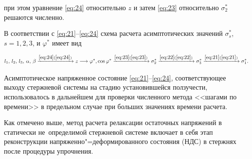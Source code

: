 при этом уравнение \eqref{eq:24} относительно $z$ и затем \eqref{eq:23} относительно $\sigma_2^{\ast}$ решаются численно. 

В соответствии с \eqref{eq:21}--\eqref{eq:24} схема расчета асимптотических значений $\sigma_s^{\ast}$, $s=1,2,3$, и $\varphi^{\ast}$ имеет вид

\begin{equation}

\label{eq:25}

l_1,\,l_2,\,l_3,\,\alpha,\,\beta

\xrightarrow{\eqref{eq:24}(\ref{eq:24})}


z

\longrightarrow 

\varphi^{\ast}, \cos{\varphi^{\ast}}

\xrightarrow{\eqref{eq:23}(\ref{eq:23})}


\sigma_{2}^{\ast}

\xrightarrow{\eqref{eq:22}(\ref{eq:22})}


\sigma_{3}^{\ast}

\xrightarrow{\eqref{eq:21}(\ref{eq:21})}


\sigma_{1}^{\ast}. 

\end{equation}



Асимптотическое напряженное состояние \eqref{eq:21}--\eqref{eq:24}, соответствующее выходу стержневой системы на стадию установившейся ползучести, использовалось в дальнейшем для проверки численного метода <<шагами по времени>> в предельном случае при больших значениях времени расчета.



\smallskip




Как отмечено выше, метод расчета релаксации остаточных напряжений в статически не~определимой стержневой системе включает в себя этап реконструкции напряженно"=деформированного состояния (НДС) в стержнях после процедуры упрочнения.

